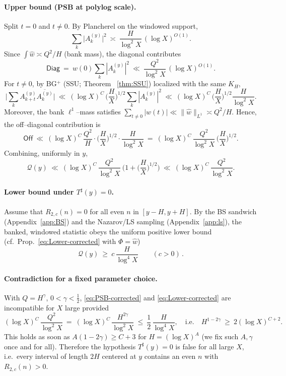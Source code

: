 \paragraph{Upper bound (PSB at polylog scale).}
Split $t=0$ and $t\neq 0$. By Plancherel on the windowed support,
\[
\sum_{k}\big|A_k^{(y)}\big|^2\ \asymp\ \frac{H}{\log^2 X}\,(\log X)^{O(1)}.
\]
Since $\int\widehat w\asymp Q^2/H$ (bank mass), the diagonal contributes
\[
\mathsf{Diag}\ =\ w(0)\sum_k |A_k^{(y)}|^2\ \ll\ \frac{Q^2}{\log^2 X}\,(\log X)^{O(1)}.
\]
For $t\neq 0$, by BG$^+$ (SSU; Theorem ~\ref{thm:SSU}) localized with the same $K_H$,
\[
\bigg|\sum_{k}A_{k+t}^{(y)}\overline{A_k^{(y)}}\bigg|\ \ll\ 
(\log X)^{C}\,\Big(\frac{H}{X}\Big)^{1/2}\sum_k |A_k^{(y)}|^2
\ \ll\ (\log X)^{C}\,\Big(\frac{H}{X}\Big)^{1/2}\frac{H}{\log^2 X}.
\]
Moreover, the bank $\ell^1$–mass satisfies $\sum_{t\neq 0} |w(t)| \ll \|\widehat w\|_{L^1}\asymp Q^2/H$.
Hence, the off–diagonal contribution is
\[
\mathsf{Off}\ \ll\ (\log X)^{C}\,\frac{Q^2}{H}\cdot \Big(\frac{H}{X}\Big)^{1/2}\cdot \frac{H}{\log^2 X}
\ =\ (\log X)^{C}\,\frac{Q^2}{\log^2 X}\,\Big(\frac{H}{X}\Big)^{1/2}.
\]
Combining, uniformly in $y$,
\begin{equation}\label{eq:PSB-corrected}
\boxed{\quad
\mathcal Q(y)\ \ll\ (\log X)^{C}\,\frac{Q^2}{\log^2 X}\ \Big(1+\Big(\frac{H}{X}\Big)^{1/2}\Big)
\ \ll\ (\log X)^{C}\,\frac{Q^2}{\log^2 X}.\quad}
\end{equation}
\paragraph{Lower bound under $T^\sharp(y)=0$.}
Assume that $R_{2,c}(n)=0$ for all even $n$ in $[y-H,y+H]$. By the BS sandwich (Appendix~\ref{app:BS}) and the Nazarov/LS sampling (Appendix~\ref{app:ls}), the banked, windowed statistic obeys the uniform positive lower bound (cf.\ Prop.~\ref{eq:Lower-corrected} with $\Phi=\widehat w$)
\begin{equation}\label{eq:Lower-corrected}
\boxed{\qquad
\mathcal Q(y)\ \ge\ c\,\frac{H}{\log^4 X}\qquad (c>0)\,.
\qquad}
\end{equation}
\paragraph{Contradiction for a fixed parameter choice.}
With $Q=H^\gamma$, $0<\gamma<\tfrac12$, \eqref{eq:PSB-corrected} and \eqref{eq:Lower-corrected} are incompatible for $X$ large provided
\[
(\log X)^{C}\,\frac{Q^2}{\log^2 X}\ =\ (\log X)^{C}\,\frac{H^{2\gamma}}{\log^2 X}\ \le\ \frac12\,\frac{H}{\log^4 X},
\quad\text{i.e.}\quad
H^{1-2\gamma}\ \ge\ 2(\log X)^{C+2}.
\]
This holds as soon as $A(1-2\gamma)\ge C+3$ for $H=(\log X)^A$ (we fix such $A,\gamma$ once and for all).
Therefore the hypothesis $T^\sharp(y)=0$ is false for all large $X$, i.e.\ every interval of length $2H$ centered at $y$ contains an even $n$ with $R_{2,c}(n)>0$.
\qedhere

